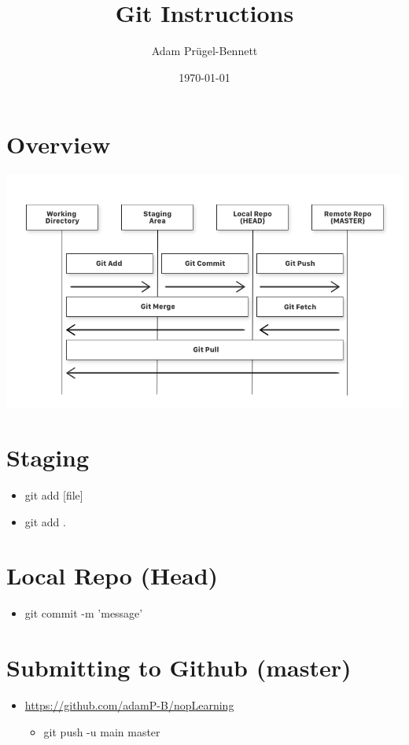 \documentclass[11pt]{article}
\author{Adam Prügel-Bennett}
\date{\today}
\title{Git Instructions}
\begin{document}
\maketitle
\tableofcontents


\section{Overview}
\label{sec:org905c468}
\begin{center}
\includegraphics[width=.9\linewidth]{./git.png}
\end{center}

\section{Staging}
\label{sec:orgd326cac}
\begin{itemize}
\item git add [file]
\item git add .
\end{itemize}

\section{Local Repo (Head)}
\label{sec:org92b39c6}
\begin{itemize}
\item git commit -m 'message'
\end{itemize}

\section{Submitting to Github (master)}
\label{sec:org1e12b69}
\begin{itemize}
\item \url{https://github.com/adamP-B/nopLearning}
\begin{itemize}
\item git push -u main master
\end{itemize}
\end{itemize}
\end{document}
